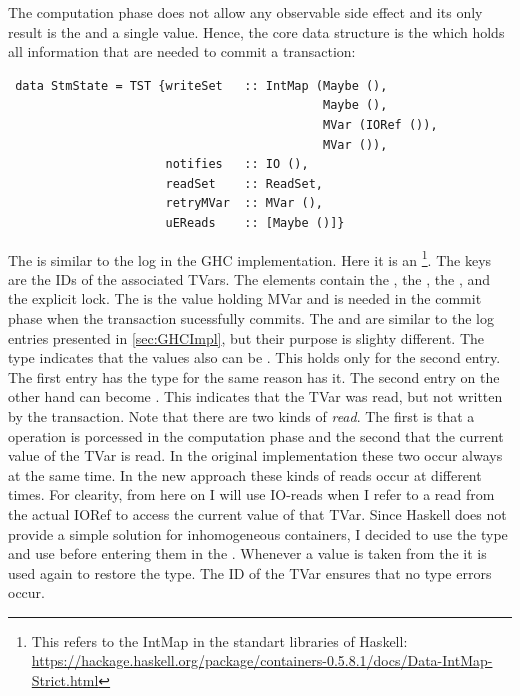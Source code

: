 The computation phase does not allow any observable side effect and its only result is the  and 
a single value.
Hence, the core data structure is the  which holds all information that are needed to commit a transaction:
\begin{lstlisting}
 data StmState = TST {writeSet   :: IntMap (Maybe (),
                                            Maybe (),
                                            MVar (IORef ()),
                                            MVar ()),
                      notifies   :: IO (),
                      readSet    :: ReadSet,
                      retryMVar  :: MVar (),
                      uEReads    :: [Maybe ()]}
\end{lstlisting}
The  is similar to the log in the GHC implementation. Here it is an  
\footnote{This refers to the IntMap in the standart libraries of Haskell: \url{https://hackage.haskell.org/package/containers-0.5.8.1/docs/Data-IntMap-Strict.html}}. 
The keys are the IDs of the associated TVars. The elements contain the ,
the , the , and the explicit lock. The  is the value holding 
MVar and is needed in the commit
phase when the transaction sucessfully commits. The  
and  are similar to the log entries presented in \ref{sec:GHCImpl}, but their purpose is slighty 
different. The  type indicates that the values also can be . This holds
only for the second entry. The first entry has the  type for the same reason 
 has it. The second entry on the other hand can become . This indicates
that the TVar was read, but not written by the transaction. Note that there are two kinds of 
\textit{read}. The first is that a  operation is porcessed in the computation phase
and the second that the current value of the TVar is read. In the original implementation these 
two occur always at the same time. In the new approach these kinds of reads occur at different times.
For clearity, from here on I will use IO-reads when I refer to a read from the actual IORef to access
the current value of that TVar. Since Haskell does not provide a simple solution for inhomogeneous
containers, I decided to use the type \code{()} and use  before
entering them in the . Whenever a value is taken from the  it
 is used again to restore the type. The ID of the TVar ensures that no type
errors occur.

